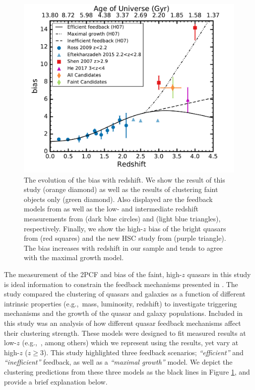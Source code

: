\documentclass[apj, numberedappendix]{emulateapj}
\begin{document}
\begin{figure}[b!]
\includegraphics[scale = 0.35]{./New_Plots/Bais_v_Redshift_paper.pdf}
\centering
\caption{\footnotesize{The evolution of the bias with redshift. We show the result of this study (orange diamond) as well as the results of clustering faint objects only (green diamond). Also displayed are the feedback models from \citet{Hopkins2007} as well as the low- and intermediate redshift measurements from \citet{Ross2009} (dark blue circles) and \citet{Eft2015} (light blue triangles), respectively. Finally, we show the high-$z$ bias of the bright quasars from \citet{Shen2007} (red squares) and the new HSC study from \citet{He2017} (purple triangle). The bias increases with redshift in our sample and tends to agree with the maximal growth model.}}
\label{fig:BZ}
\end{figure}

The measurement of the 2PCF and bias of the faint, high-$z$ quasars in this study is ideal information to constrain the feedback mechanisms presented in \citet{Hopkins2007}. The \citet{Hopkins2007} study compared the clustering of quasars and galaxies as a function of different intrinsic properties (e.g.,\ mass, luminosity, redshift) to investigate triggering mechanisms and the growth of the quasar and galaxy populations. Included in this study was an analysis of how different quasar feedback mechanisms affect their clustering strength. These models were designed to fit measured results at low-$z$ (e.g.,\ \citealt{Croom2005}, among others) which we represent using the \citet{Ross2009} results, yet vary at high-$z$ ($z \geq 3$). This study highlighted three feedback scenarios; {\it{``efficient''}} and {\it{``inefficient''}} feedback, as well as a {\it{``maximal growth''}} model. We depict the clustering predictions from these three models as the black lines in Figure \ref{fig:BZ}, and provide a brief explanation below.
\end{document}
